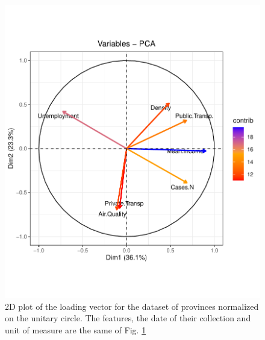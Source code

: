 \documentclass[
12pt, %
a4paper, %
oneside, %
headinclude,footinclude, %
BCOR5mm, %
]{scrartcl}
\begin{document}
\begin{figure}[h]
\begin{center}
\includegraphics[scale=1]{Pic/Province_FULL_Variables-PCA.pdf}
\caption{2D plot of the loading vector for the dataset of provinces normalized on the unitary circle. The features, the date of their collection and unit of measure are the same of Fig. \ref{Province_FULL_Variables-PCA}}
\label{Province_FULL_Variables-PCA}
\end{center}
\end{figure}
\end{document}
